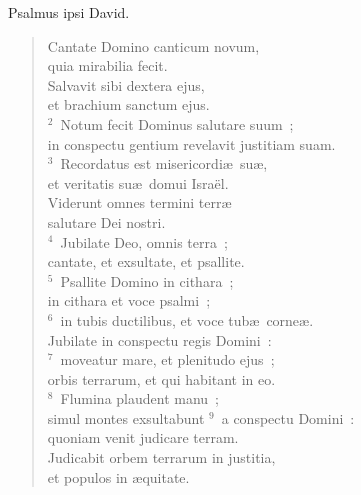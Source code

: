 \bchapter
\lettrine[lines=3,image=true,loversize=0.05,lraise=-0.03]{P}{}salmus ipsi David. \begin{flushleft}\begin{verse}\vspace{6pt}Cantate Domino canticum novum,\\ quia mirabilia fecit.\\ Salvavit sibi dextera ejus,\\ et brachium sanctum ejus.\\
${}^{2}$~Notum fecit Dominus salutare suum~;\\ in conspectu gentium revelavit justitiam suam.\\
${}^{3}$~Recordatus est misericordi\ae\ su\ae ,\\ et veritatis su\ae\ domui Isra\"el.\\ Viderunt omnes termini terr\ae \\ salutare Dei nostri.\\
${}^{4}$~Jubilate Deo, omnis terra~;\\ cantate, et exsultate, et psallite.\\
${}^{5}$~Psallite Domino in cithara~;\\ in cithara et voce psalmi~;\\
${}^{6}$~in tubis ductilibus, et voce tub\ae\ corne\ae .\\ Jubilate in conspectu regis Domini~:\\
${}^{7}$~moveatur mare, et plenitudo ejus~;\\ orbis terrarum, et qui habitant in eo.\\
${}^{8}$~Flumina plaudent manu~;\\ simul montes exsultabunt
${}^{9}$~a conspectu Domini~:\\ quoniam venit judicare terram.\\ Judicabit orbem terrarum in justitia,\\ et populos in \ae quitate.\end{verse}\end{flushleft}



